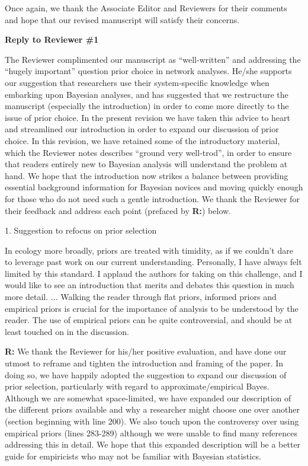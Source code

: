 \documentclass[12pt]{letter}
\newenvironment{refquote}{\bigskip \begin{it}}{\end{it}\smallskip}
\begin{document}
	Once again, we thank the Associate Editor and Reviewers for their comments and hope that our revised manuscript will satisfy their concerns.

\newpage


{\Large \bf Reply to Reviewer \#1}


	The Reviewer complimented our manuscript as ``well-written'' and addressing the ``hugely important'' question prior choice in network analyses. He/she supports our suggestion that researchers use their system-specific knowledge when embarking upon Bayesian analyses, and has suggested that we restructure the manuscript (especially the introduction) in order to come more directly to the issue of prior choice. In the present revision we have taken this advice to heart and streamlined our introduction in order to expand our discussion of prior choice. In this revision, we have retained some of the introductory material, which the Reviewer notes describes ``ground very well-trod'', in order to ensure that readers entirely new to Bayesian analysis will understand the problem at hand. We hope that the introduction now strikes a balance between providing essential background information for Bayesian novices and moving quickly enough for those who do not need such a gentle introduction. We thank the Reviewer for their feedback and address each point (prefaced by \textbf{R:}) below.


	1. Suggestion to refocus on prior selection

		\begin{refquote}
			In ecology more broadly, priors are treated with timidity, as if we couldn't dare to leverage past work on our current understanding. Personally, I have always felt limited by this standard. I applaud the authors for taking on this challenge, and I would like to see an introduction that merits and debates this question in much more detail. ... Walking the reader through flat priors, informed priors and empirical priors is crucial for the importance of analysis to be understood by the reader. The use of empirical priors can be quite controversial, and should be at least touched on in the discussion. 
			\end{refquote}


		\textbf{R:} We thank the Reviewer for his/her positive evaluation, and have done our utmost to reframe and tighten the introduction and framing of the paper. In doing so, we have happily adopted the suggestion to expand our discussion of prior selection, particularly with regard to approximate/empirical Bayes. Although we are somewhat space-limited, we have expanded our description of the different priors available and why a researcher might choose one over another (section beginning with line 200). We also touch upon the controversy over using empirical priors (lines 283-289) although we were unable to find many references addressing this in detail. We hope that this expanded description will be a better guide for empiricists who may not be familiar with Bayesian statistics.
\end{document}
